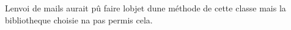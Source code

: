 
\begin{DoxyRefList}
\item[\label{bug__bug000001}%
\hypertarget{bug__bug000001}{}%
Classe \hyperlink{classDataBase}{Data\+Base} ]L\textquotesingle{}envoi de mails aurait pû faire l\textquotesingle{}objet d\textquotesingle{}une méthode de cette classe mais la bibliotheque choisie n\textquotesingle{}a pas permis cela. 
\end{DoxyRefList}